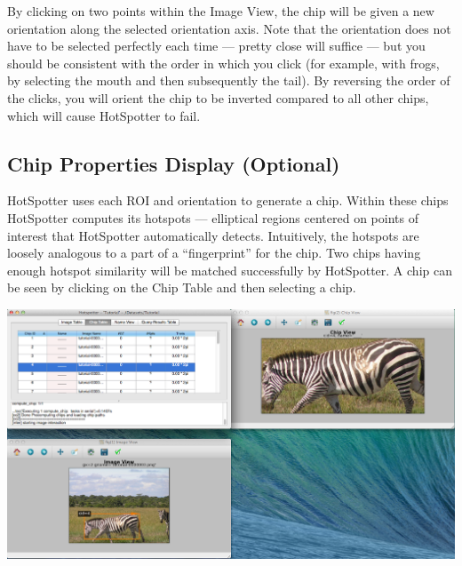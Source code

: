 \documentclass[a4paper,10pt]{article}
\begin{document}
        \noindent
        By clicking on two points within the Image View, the chip will be given a new orientation along the selected
       orientation axis.  Note that the orientation does not have to be
        selected perfectly each time --- pretty close will suffice ---
        but you should be consistent with the order in which you
        click (for example, with frogs, by selecting the mouth and then subsequently the tail).  By reversing the order
	of the clicks, you will orient the chip to be inverted compared to all other chips, which will cause HotSpotter to fail.

    \subsection{Chip Properties Display (Optional)} 
        HotSpotter uses each ROI and orientation to generate a chip. 
        Within these chips HotSpotter computes its hotspots --- elliptical
        regions centered on points of interest that HotSpotter automatically
        detects.  Intuitively, the hotspots are loosely analogous to a
        part of a ``fingerprint'' for the chip.  Two chips having enough hotspot similarity
        will be matched successfully by HotSpotter. A chip can be seen by clicking 
	on the Chip Table and then selecting a chip.

        \begin{center}
          \includegraphics[scale=0.2]{images/chip.png}
        \end{center}
\end{document}
